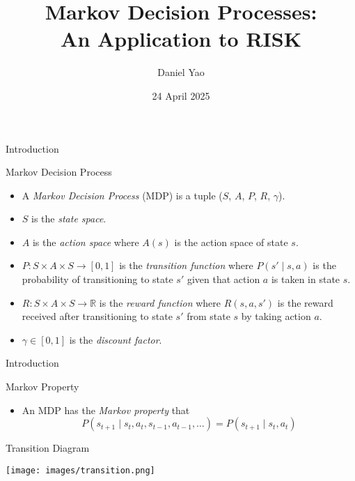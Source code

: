 \documentclass{beamer}
\title[MDP]{Markov Decision Processes: \\An Application to RISK}
\author{Daniel Yao}
\institute{Johns Hopkins University}
\date{24 April 2025}
\begin{document}
\begin{frame}

\titlepage

\end{frame}


\begin{frame}{Introduction}

\begin{block}{Markov Decision Process \cite{puterman2014markov}} 
\begin{itemize}
\item A \textit{Markov Decision Process} (MDP) is a tuple ($S$, $A$, $P$, $R$, $\gamma$).
\item $S$ is the \textit{state space}.
\item $A$ is the \textit{action space} where $A(s)$ is the action space of state $s$.
\item $P: S \times A \times S \to [0, 1]$ is the \textit{transition function} where $P(s' \mid s, a)$ is the probability of transitioning to state $s'$ given that action $a$ is taken in state $s$.
\item $R: S \times A \times S \to \mathbb{R}$ is the \textit{reward function} where $R(s, a, s')$ is the reward received after transitioning to state $s'$ from state $s$ by taking action $a$.
\item $\gamma \in [0, 1]$ is the \textit{discount factor}.
\end{itemize}
\end{block}

\end{frame}


\begin{frame}{Introduction}

\begin{block}{Markov Property \cite{puterman2014markov}} 
\begin{itemize}
\item An MDP has the \textit{Markov property} that 
$$P(s_{t+1} \mid s_{t}, a_{t}, s_{t-1}, a_{t-1}, \ldots) = P(s_{t+1} \mid s_{t}, a_{t})$$
\end{itemize}
\end{block}

\begin{block}{Transition Diagram \cite{puterman2014markov}}
\end{block}

\begin{center} \texttt{[image: images/transition.png]} \end{center}

\end{frame}
\end{document}
